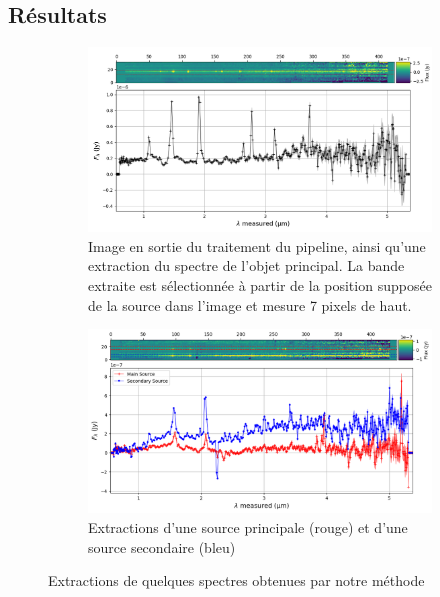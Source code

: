 \documentclass[12pt, a4paper]{article}
\begin{document}
\subsection{Résultats}

\begin{figure}[!h]
  \begin{subfigure}[t]{0.48\textwidth}
      \centering
      \includegraphics[width=1\textwidth]{assets/jw01345-o063_s32304_nirspec_clear-prism_extracted.png}
      \caption{Image en sortie du traitement du pipeline, ainsi qu'une extraction du spectre de l'objet principal. La bande extraite est sélectionnée à partir de la position supposée de la source dans l'image et mesure 7 pixels de haut.}
      \label{fig:extraction_32304}
  \end{subfigure}
  \hfill
  \begin{subfigure}[t]{0.48\textwidth}
      \centering
      \includegraphics[width=1\textwidth]{assets/extraction_2_sources_P7-23642.png}
      \caption{Extractions d'une source principale (rouge) et d'une source secondaire (bleu)}
      \label{fig:extraction_2_sources}
  \end{subfigure}
  \caption{Extractions de quelques spectres obtenues par notre méthode}
\end{figure}
\end{document}
